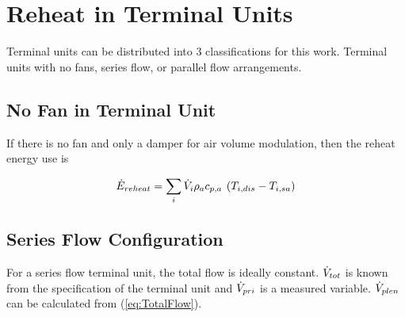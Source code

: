 
\section{Reheat in Terminal Units}

Terminal units can be distributed into 3 classifications for this work.
Terminal units with no fans, series flow, or parallel flow arrangements.

\subsection{No Fan in Terminal Unit}

If there is no fan and only a damper for air volume modulation, then the reheat
energy use is

\begin{equation} \label{eq:ReheatEnergy}
    {\dot E_{reheat}} = \sum\limits_i {{\dot{V}_{i}}\rho_a c_{p,a}\:\left( {{T_{i,dis}} - {T_{i,sa}}} \right)}
\end{equation}

\subsection{Series Flow Configuration}

For a series flow terminal unit, the total flow is ideally constant.
\(\dot{V}_{tot}\) is known from the specification of the terminal unit and
\(\dot{V}_{pri}\) is a measured variable. \(\dot{V}_{plen}\) can be calculated from
 (\ref{eq:TotalFlow}).

